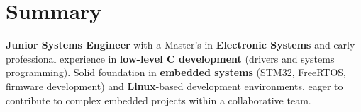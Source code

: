 \section{Summary}

    \begin{minipage}{0.95\textwidth}

        \textbf{Junior Systems Engineer} with a Master's in \textbf{Electronic Systems} and early professional experience in \textbf{low-level C development} (drivers and systems programming). Solid foundation in \textbf{embedded systems} (STM32, FreeRTOS, firmware development) and \textbf{Linux}-based development environments, eager to contribute to complex embedded projects within a collaborative team.        
        
    \end{minipage}